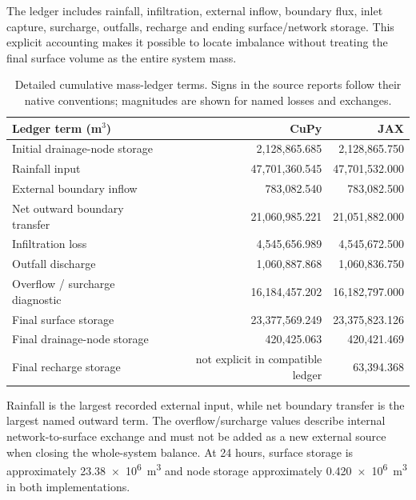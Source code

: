 \documentclass[11pt,a4paper,oneside]{report}
\begin{document}
The ledger includes rainfall, infiltration, external inflow, boundary flux, inlet capture,
surcharge, outfalls, recharge and ending surface/network storage. This explicit accounting
makes it possible to locate imbalance without treating the final surface volume as the
entire system mass.

\begin{table}[H]
\centering
\caption[Detailed 24-hour mass-ledger terms.]{Detailed cumulative mass-ledger terms. Signs
in the source reports follow their native conventions; magnitudes are shown for named
losses and exchanges.}
\label{tab:ledgerdetail}
\footnotesize
\begin{tabular}{|l|r|r|}
\hline
\textbf{Ledger term (m$^3$)} & \textbf{CuPy} & \textbf{JAX} \\
\hline\hline
Initial drainage-node storage & 2,128,865.685 & 2,128,865.750 \\ \hdashline[0.4pt/1.2pt]
Rainfall input & 47,701,360.545 & 47,701,532.000 \\ \hdashline[0.4pt/1.2pt]
External boundary inflow & 783,082.540 & 783,082.500 \\ \hdashline[0.4pt/1.2pt]
Net outward boundary transfer & 21,060,985.221 & 21,051,882.000 \\ \hdashline[0.4pt/1.2pt]
Infiltration loss & 4,545,656.989 & 4,545,672.500 \\ \hdashline[0.4pt/1.2pt]
Outfall discharge & 1,060,887.868 & 1,060,836.750 \\ \hdashline[0.4pt/1.2pt]
Overflow / surcharge diagnostic & 16,184,457.202 & 16,182,797.000 \\ \hdashline[0.4pt/1.2pt]
Final surface storage & 23,377,569.249 & 23,375,823.126 \\ \hdashline[0.4pt/1.2pt]
Final drainage-node storage & 420,425.063 & 420,421.469 \\ \hdashline[0.4pt/1.2pt]
Final recharge storage & not explicit in compatible ledger & 63,394.368 \\
\hline
\end{tabular}
\end{table}

Rainfall is the largest recorded external input, while net boundary transfer is the largest
named outward term. The overflow/surcharge values describe internal network-to-surface
exchange and must not be added as a new external source when closing the whole-system
balance. At 24 hours, surface storage is approximately \SI{23.38e6}{\cubic\metre} and node
storage approximately \SI{0.420e6}{\cubic\metre} in both implementations.
\end{document}
